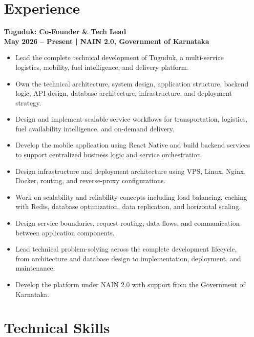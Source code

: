 \documentclass[10pt]{article}
\begin{document}
\section{Experience}

\textbf{Tuguduk: Co-Founder \& Tech Lead} \\

\textbf{May 2026 -- Present | NAIN 2.0, Government of Karnataka}

\begin{itemize}
    \item Lead the complete technical development of Tuguduk, a multi-service logistics, mobility, fuel intelligence, and delivery platform.
    \item Own the technical architecture, system design, application structure, backend logic, API design, database architecture, infrastructure, and deployment strategy.
    \item Design and implement scalable service workflows for transportation, logistics, fuel availability intelligence, and on-demand delivery.
    \item Develop the mobile application using React Native and build backend services to support centralized business logic and service orchestration.
    \item Design infrastructure and deployment architecture using VPS, Linux, Nginx, Docker, routing, and reverse-proxy configurations.
    \item Work on scalability and reliability concepts including load balancing, caching with Redis, database optimization, data replication, and horizontal scaling.
    \item Design service boundaries, request routing, data flows, and communication between application components.
    \item Lead technical problem-solving across the complete development lifecycle, from architecture and database design to implementation, deployment, and maintenance.
    \item Develop the platform under NAIN 2.0 with support from the Government of Karnataka.
\end{itemize}



\section{Technical Skills}
\end{document}
